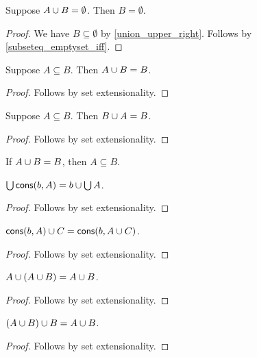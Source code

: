\begin{proposition}%
\label{union_emptyset_elim_right}
    Suppose $A\cup B = \emptyset$. Then $B = \emptyset$.
\end{proposition}
\begin{proof}
    We have $B\subseteq\emptyset$ by \cref{union_upper_right}.
    Follows by \cref{subseteq_emptyset_iff}.
\end{proof}

\begin{proposition}%
\label{union_absorb_subseteq_left}
    Suppose $A\subseteq B$. Then $A\cup B = B$.
\end{proposition}
\begin{proof}
    Follows by set extensionality.
\end{proof}

\begin{proposition}%
\label{union_absorb_subseteq_right}
    Suppose $A\subseteq B$. Then $B\cup A = B$.
\end{proposition}
\begin{proof}
    Follows by set extensionality.
\end{proof}

\begin{proposition}%
\label{union_eq_self_implies_subseteq}
    If $A\cup B = B$, then $A\subseteq B$.
\end{proposition}

\begin{proposition}\label{unions_cons}
    $\bigcup \operatorname{\mathsf{cons}}(b,A) = b\cup\bigcup A$.
\end{proposition}
\begin{proof}
    Follows by set extensionality.
\end{proof}

\begin{proposition}\label{union_cons}
    $\operatorname{\mathsf{cons}}(b,A) \cup C = \operatorname{\mathsf{cons}}(b,A\cup C)$.
\end{proposition}
\begin{proof}
    Follows by set extensionality.
\end{proof}

\begin{proposition}\label{union_absorb_left}
    $A\cup (A\cup B) = A\cup B$.
\end{proposition}
\begin{proof}
    Follows by set extensionality.
\end{proof}

\begin{proposition}\label{union_absorb_right}
    $(A\cup B)\cup B = A\cup B$.
\end{proposition}
\begin{proof}
    Follows by set extensionality.
\end{proof}

